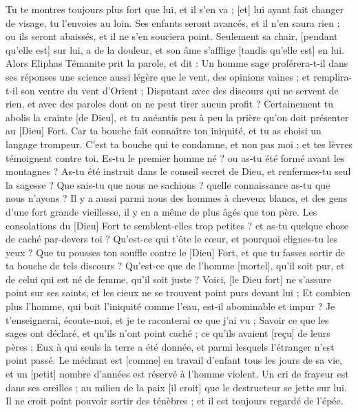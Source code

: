 \begin{multicols}{2}
Tu te montres toujours plus fort que lui, et il s'en va ; [et] lui ayant fait changer de visage, tu l'envoies au loin.
Ses enfants seront avancés, et il n'en saura rien ; ou ils seront abaissés, et il ne s'en souciera point.
Seulement sa chair, [pendant qu'elle est] sur lui, a de la douleur, et son âme s'afflige [tandis qu'elle est] en lui.
\VerseOne{}Alors Eliphas Témanite prit la parole, et dit :
Un homme sage proférera-t-il dans ses réponses une science aussi légère que le vent, des opinions vaines ; et remplira-t-il son ventre du vent d'Orient ;
Disputant avec des discours qui ne servent de rien, et avec des paroles dont on ne peut tirer aucun profit ?
Certainement tu abolis la crainte [de Dieu], et tu anéantis peu à peu la prière qu'on doit présenter au [Dieu] Fort.
Car ta bouche fait connaître ton iniquité, et tu as choisi un langage trompeur.
C'est ta bouche qui te condamne, et non pas moi ; et tes lèvres témoignent contre toi.
Es-tu le premier homme né ? ou as-tu été formé avant les montagnes ?
As-tu été instruit dans le conseil secret de Dieu, et renfermes-tu seul la sagesse ?
Que sais-tu que nous ne sachions ? quelle connaissance as-tu que nous n'ayons ?
Il y a aussi parmi nous des hommes à cheveux blancs, et des gens d'une fort grande vieillesse, il y en a même de plus âgés que ton père.
Les consolations du [Dieu] Fort te semblent-elles trop petites ? et as-tu quelque chose de caché par-devers toi ?
Qu'est-ce qui t'ôte le cœur, et pourquoi clignes-tu les yeux ?
Que tu pousses ton souffle contre le [Dieu] Fort, et que tu fasses sortir de ta bouche de tels discours ?
Qu'est-ce que de l'homme [mortel], qu'il soit pur, et de celui qui est né de femme, qu'il soit juste ?
Voici, [le Dieu fort] ne s'assure point sur ses saints, et les cieux ne se trouvent point purs devant lui ;
Et combien plus l'homme, qui boit l'iniquité comme l'eau, est-il abominable et impur ?
Je t'enseignerai, écoute-moi, et je te raconterai ce que j'ai vu ;
Savoir ce que les sages ont déclaré, et qu'ils n'ont point caché ; ce qu'ils avaient [reçu] de leurs pères ;
Eux à qui seuls la terre a été donnée, et parmi lesquels l'étranger n'est point passé.
Le méchant est [comme] en travail d'enfant tous les jours de sa vie, et un [petit] nombre d'années est réservé à l'homme violent.
Un cri de frayeur est dans ses oreilles ; au milieu de la paix [il croit] que le destructeur se jette sur lui.
Il ne croit point pouvoir sortir des ténèbres ; et il est toujours regardé de l'épée.

\end{multicols}
